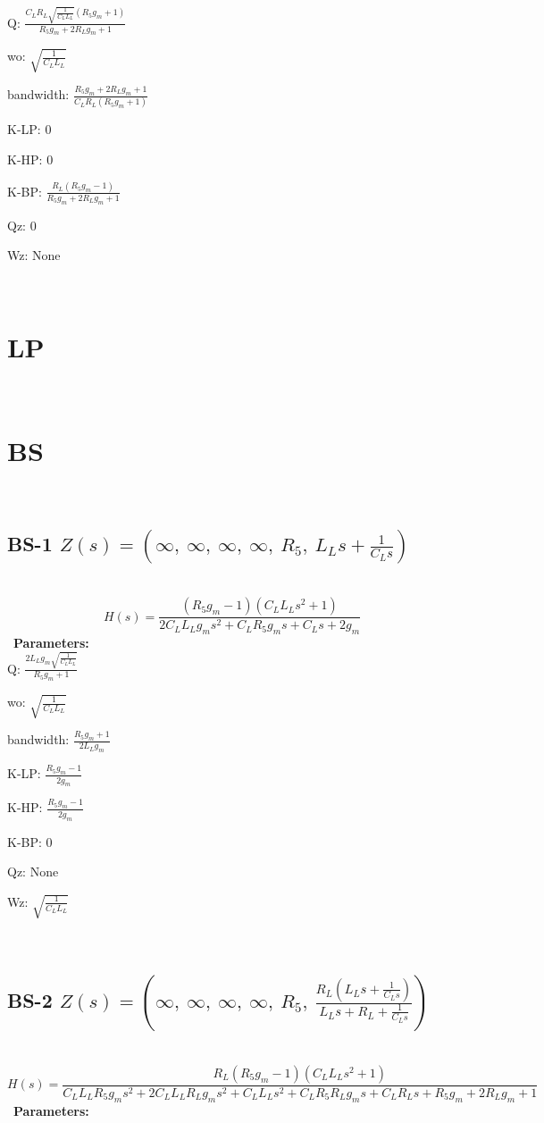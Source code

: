 \documentclass{article}
\begin{document}
Q: $\frac{C_{L} R_{L} \sqrt{\frac{1}{C_{L} L_{L}}} \left(R_{5} g_{m} + 1\right)}{R_{5} g_{m} + 2 R_{L} g_{m} + 1}$\ 

wo: $\sqrt{\frac{1}{C_{L} L_{L}}}$\ 

bandwidth: $\frac{R_{5} g_{m} + 2 R_{L} g_{m} + 1}{C_{L} R_{L} \left(R_{5} g_{m} + 1\right)}$\ 

K-LP: $0$\ 

K-HP: $0$\ 

K-BP: $\frac{R_{L} \left(R_{5} g_{m} - 1\right)}{R_{5} g_{m} + 2 R_{L} g_{m} + 1}$\ 

Qz: $0$\ 

Wz: $\text{None}$\ 

\ 

\section{LP}\ 
\section{BS}\ 
\subsection{BS-1 $Z(s) = \left( \infty, \  \infty, \  \infty, \  \infty, \  R_{5}, \  L_{L} s + \frac{1}{C_{L} s}\right)$ } \ 
\textbf{\[H(s) = \frac{\left(R_{5} g_{m} - 1\right) \left(C_{L} L_{L} s^{2} + 1\right)}{2 C_{L} L_{L} g_{m} s^{2} + C_{L} R_{5} g_{m} s + C_{L} s + 2 g_{m}}\] } \ 
\textbf{Parameters:}\\ 

Q: $\frac{2 L_{L} g_{m} \sqrt{\frac{1}{C_{L} L_{L}}}}{R_{5} g_{m} + 1}$\ 

wo: $\sqrt{\frac{1}{C_{L} L_{L}}}$\ 

bandwidth: $\frac{R_{5} g_{m} + 1}{2 L_{L} g_{m}}$\ 

K-LP: $\frac{R_{5} g_{m} - 1}{2 g_{m}}$\ 

K-HP: $\frac{R_{5} g_{m} - 1}{2 g_{m}}$\ 

K-BP: $0$\ 

Qz: $\text{None}$\ 

Wz: $\sqrt{\frac{1}{C_{L} L_{L}}}$\ 

\ 

\subsection{BS-2 $Z(s) = \left( \infty, \  \infty, \  \infty, \  \infty, \  R_{5}, \  \frac{R_{L} \left(L_{L} s + \frac{1}{C_{L} s}\right)}{L_{L} s + R_{L} + \frac{1}{C_{L} s}}\right)$ } \ 
\textbf{\[H(s) = \frac{R_{L} \left(R_{5} g_{m} - 1\right) \left(C_{L} L_{L} s^{2} + 1\right)}{C_{L} L_{L} R_{5} g_{m} s^{2} + 2 C_{L} L_{L} R_{L} g_{m} s^{2} + C_{L} L_{L} s^{2} + C_{L} R_{5} R_{L} g_{m} s + C_{L} R_{L} s + R_{5} g_{m} + 2 R_{L} g_{m} + 1}\] } \ 
\textbf{Parameters:}\\ 
\end{document}
